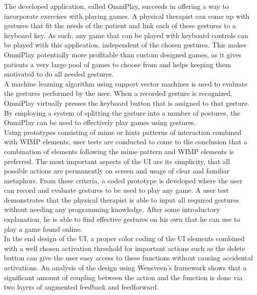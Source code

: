 The developed application, called OmniPlay, succeeds in offering a way to incorporate exercises with playing games. A physical therapist can come up with gestures that fit the needs of the patient and link each of these gestures to a keyboard key. As such, any game that can be played with keyboard controls can be played with this application, independent of the chosen gestures. This makes OmniPlay potentially more profitable than custom designed games, as it gives patients a very large pool of games to choose from and helps keeping them motivated to do all needed gestures.\\

A machine learning algorithm using support vector machines is used to evaluate the gestures performed by the user. When a recorded gesture is recognized, OmniPlay virtually presses the keyboard button that is assigned to that gesture. By employing a system of splitting the gesture into a number of postures, the OmniPlay can be used to effectively play games using gestures.\\

Using prototypes consisting of mime or hints patterns of interaction combined with WIMP elements, user tests are conducted to come to the conclusion that a combination of elements following the mime pattern and WIMP elements is preferred. The most important aspects of the UI are its simplicity, that all possible actions are permanently on screen and usage of clear and familiar metaphors. From these criteria, a coded prototype is developed where the user can record and evaluate gestures to be used to play any game. A user test demonstrates that the physical therapist is able to input all required gestures without needing any programming knowledge. After some introductory explanation, he is able to find effective gestures on his own that he can use to play a game found online.\\

In the end design of the UI, a proper color coding of the UI elements combined with a well chosen activation threshold for important actions such as the delete button can give the user easy access to these functions without causing accidental activations. An analysis of the design using Wensveen's framework shows that a significant amount of coupling between the action and the function is done via two layers of augmented feedback and feedforward.
